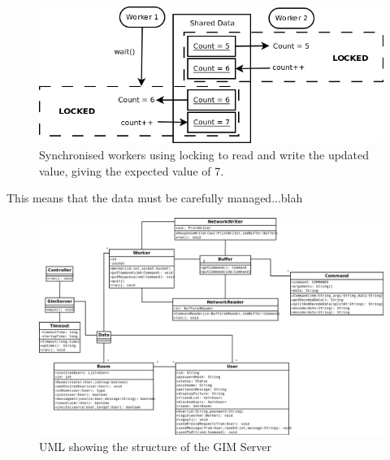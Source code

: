 \begin{figure}[!h]
    \begin{center}
        \includegraphics[scale=0.6]{Design/diagrams/server_locking.png}
        \caption{Synchronised workers using locking to read and write the updated value, giving the expected value of 7.}
        \label{lockingDia}
    \end{center}
\end{figure}

This means that the data must be carefully managed...blah

\newpage
\begin{landscape}
    \begin{figure}
        \begin{center}
            \includegraphics[scale=0.5]{Design/diagrams/server_uml.png}
            \caption{UML showing the structure of the GIM Server}
            \label{highLevelDia}
        \end{center}
    \end{figure}
\end{landscape}
